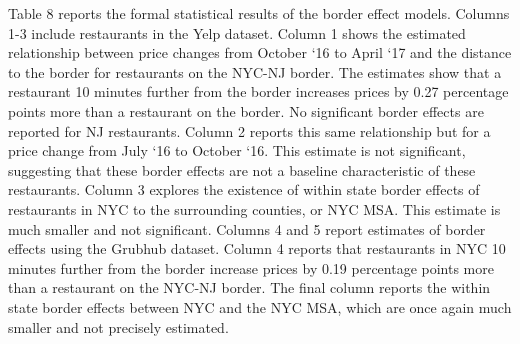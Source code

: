 \documentclass[11pt]{article}
\begin{document}
Table 8 reports the formal statistical results of the border effect models. Columns 1-3 include restaurants in the Yelp dataset. Column 1 shows the estimated relationship between price changes from October `16 to April `17 and the distance to the border for restaurants on the NYC-NJ border. The estimates show that a restaurant 10 minutes further from the border increases prices by 0.27 percentage points more than a restaurant on the border. No significant border effects are reported for NJ restaurants. Column 2 reports this same relationship but for a price change from July `16 to October `16. This estimate is not significant, suggesting that these border effects are not a baseline characteristic of these restaurants. Column 3 explores the existence of within state border effects of restaurants in NYC to the surrounding counties, or NYC MSA. This estimate is much smaller and not significant. Columns 4 and 5 report estimates of border effects using the Grubhub dataset. Column 4 reports that restaurants in NYC 10 minutes further from the border increase prices by 0.19 percentage points more than a restaurant on the NYC-NJ border. The final column reports the within state border effects between NYC and the NYC MSA, which are once again much smaller and not precisely estimated. 


\end{document}
